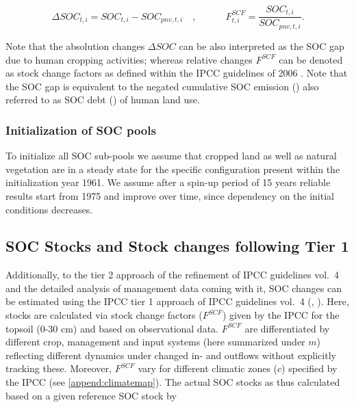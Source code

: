 \documentclass[gc, manuscript]{copernicus}
\begin{document}
\begin{equation}
\Delta SOC_{t, i} = SOC_{t, i} - SOC_{pnv, t, i}\quad, \qquad \quad  F^{SCF}_{t, i} = \frac{SOC_{t, i}}{SOC_{pnv, t, i}}.
\label{eq:totalstock}
\end{equation}

Note that the absolution changes \(\Delta SOC\) can be also interpreted as the SOC gap due to human cropping activities; whereas relative changes \(F^{SCF}\) can be denoted as stock change factors as defined within the IPCC guidelines of 2006 \citep{ipcc_2006_2006}. Note that the SOC gap is equivalent to the negated cumulative SOC emission (\citep{pugh_simulated_2015}) also referred to as SOC debt (\citep{sanderman_soil_2017}) of human land use.

\hypertarget{initialization-of-soc-pools}{%
\subsubsection{Initialization of SOC pools}\label{initialization-of-soc-pools}}

To initialize all SOC sub-pools we assume that cropped land as well as natural vegetation are in a steady state for the specific configuration present within the initialization year 1961. We assume after a spin-up period of 15 years reliable results start from 1975 and improve over time, since dependency on the initial conditions decreases.

\hypertarget{sec:tier1}{%
\subsection{SOC Stocks and Stock changes following Tier 1}\label{sec:tier1}}

Additionally, to the tier 2 approach of the refinement of IPCC guidelines vol.~4 \citep{ipcc_2019_2019} and the detailed analysis of management data coming with it, SOC changes can be estimated using the IPCC tier 1 approach of IPCC guidelines vol.~4 (\citet{ipcc_2006_2006}, \citet{ipcc_2019_2019}). Here, stocks are calculated via stock change factors (\(F^{SCF}\)) given by the IPCC for the topsoil (0-30 cm) and based on observational data. \(F^{SCF}\) are differentiated by different crop, management and input systems (here summarized under \(m\)) reflecting different dynamics under changed in- and outflows without explicitly tracking these. Moreover, \(F^{SCF}\) vary for different climatic zones (\(c\)) specified by the IPCC (see \ref{append:climatemap}). The actual SOC stocks as thus calculated based on a given reference SOC stock by
\end{document}
